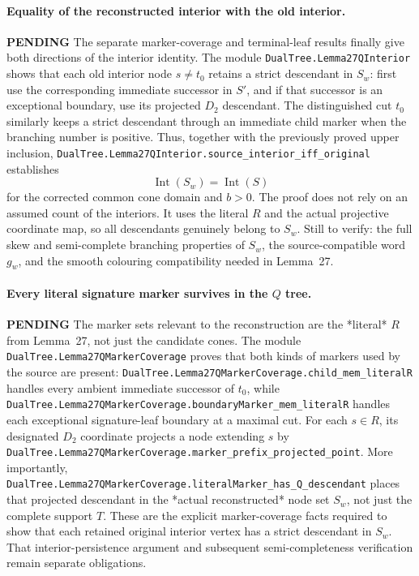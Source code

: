 \documentclass[11pt]{article}
\newcommand{\todo}{\textcolor{gray!70!black}{\textbf{PENDING}}}
\newcommand{\lean}[1]{\texttt{#1}}
\begin{document}
\paragraph{Equality of the reconstructed interior with the old interior.} \todo
The separate marker-coverage and terminal-leaf results finally
give both directions of the interior identity.  The module
\lean{DualTree.Lemma27QInterior} shows that each old interior
node $s\ne t_0$ retains a strict descendant in $S_w$: first
use the corresponding immediate successor in $S'$, and if
that successor is an exceptional boundary, use its projected
$D_2$ descendant.  The distinguished cut $t_0$ similarly
keeps a strict descendant through an immediate child marker
when the branching number is positive.
Thus, together with the previously proved upper inclusion,
\lean{DualTree.Lemma27QInterior.source_interior_iff_original}
establishes
\[
  \operatorname{Int}(S_w)=\operatorname{Int}(S)
\]
for the corrected common cone domain and $b>0$.
The proof does not rely on an assumed count of the interiors.
It uses the literal $R$ and the actual projective coordinate map,
so all descendants genuinely belong to $S_w$.
Still to verify: the full skew and semi-complete branching
properties of $S_w$, the source-compatible word $g_w$, and the
smooth colouring compatibility needed in Lemma~27.



\paragraph{Every literal signature marker survives in the $Q$ tree.} \todo
The marker sets relevant to the reconstruction are the *literal*
$R$ from Lemma~27, not just the candidate cones.  The module
\lean{DualTree.Lemma27QMarkerCoverage} proves that both kinds of
markers used by the source are present:
\lean{DualTree.Lemma27QMarkerCoverage.child_mem_literalR}
handles every ambient immediate successor of $t_0$, while
\lean{DualTree.Lemma27QMarkerCoverage.boundaryMarker_mem_literalR}
handles each exceptional signature-leaf boundary at a maximal cut.
For each $s\in R$, its designated $D_2$ coordinate projects
a node extending $s$ by
\lean{DualTree.Lemma27QMarkerCoverage.marker_prefix_projected_point}.
More importantly,
\lean{DualTree.Lemma27QMarkerCoverage.literalMarker_has_Q_descendant}
places that projected descendant in the *actual reconstructed*
node set $S_w$, not just the complete support $T$.
These are the explicit marker-coverage facts required to show that
each retained original interior vertex has a strict descendant in
$S_w$.  That interior-persistence argument and subsequent
semi-completeness verification remain separate obligations.
\end{document}
